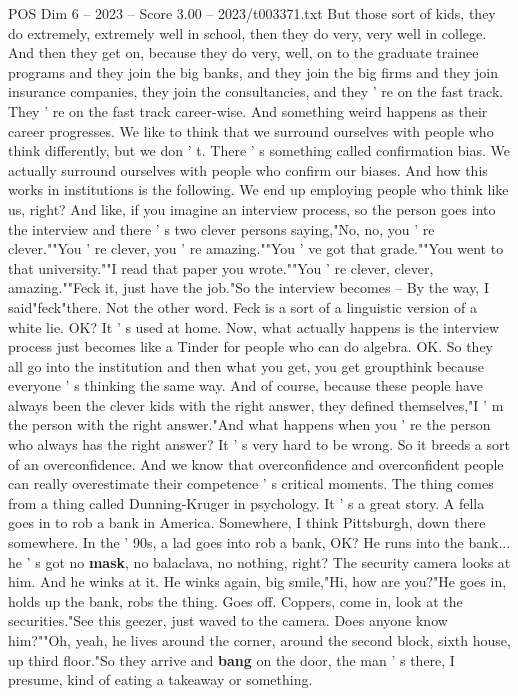 \begin{textsample}{POS Dim 6 – 2023 – Score 3.00 – 2023/t003371.txt}
But those sort of kids, they do extremely, extremely well in school, then they do very, very well in college.
And then they get on, because they do very, well, on to the graduate trainee programs and they join the big banks, and they join the big firms and they join insurance companies, they join the consultancies, and they ' re on the fast track.
They ' re on the fast track career-wise.
And something weird happens as their career progresses.
We like to think that we surround ourselves with people who think differently, but we don ' t.
There ' s something called confirmation bias.
We actually surround ourselves with people who confirm our biases.
And how this works in institutions is the following.
We end up employing people who think like us, right?
And like, if you imagine an interview process, so the person goes into the interview and there ' s two clever persons saying,"No, no, you ' re clever.""You ' re clever, you ' re amazing.""You ' ve got that grade.""You went to that university.""I read that paper you wrote.""You ' re clever, clever, amazing.""Feck it, just have the job."So the interview becomes -- By the way, I said"feck"there.
Not the other word.
Feck is a sort of a linguistic version of a white lie.
OK?
It ' s used at home.
Now, what actually happens is the interview process just becomes like a Tinder for people who can do algebra.
OK.
So they all go into the institution and then what you get, you get groupthink because everyone ' s thinking the same way.
And of course, because these people have always been the clever kids with the right answer, they defined themselves,"I ' m the person with the right answer."And what happens when you ' re the person who always has the right answer?
It ' s very hard to be wrong.
So it breeds a sort of an overconfidence.
And we know that overconfidence and overconfident people can really overestimate their competence ' s critical moments.
The thing comes from a thing called Dunning-Kruger in psychology.
It ' s a great story.
A fella goes in to rob a bank in America.
Somewhere, I think Pittsburgh, down there somewhere.
In the ' 90s, a lad goes into rob a bank, OK?
He runs into the bank... he ' s got no \textbf{mask}, no balaclava, no nothing, right?
The security camera looks at him.
And he winks at it.
He winks again, big smile,"Hi, how are you?"He goes in, holds up the bank, robs the thing.
Goes off.
Coppers, come in, look at the securities."See this geezer, just waved to the camera.
Does anyone know him?""Oh, yeah, he lives around the corner, around the second block, sixth house, up third floor."So they arrive and \textbf{bang} on the door, the man ' s there, I presume, kind of eating a takeaway or something.

\end{textsample}
